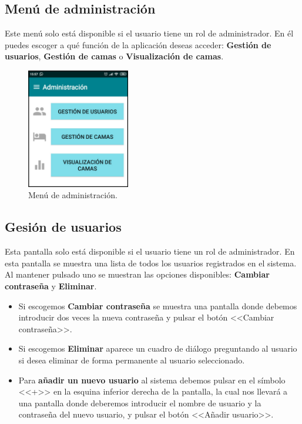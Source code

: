 \subsection{Menú de administración}

Este menú solo está disponible si el usuario tiene un rol de administrador. En él puedes escoger a qué función de la aplicación deseas acceder: \textbf{Gestión de usuarios}, \textbf{Gestión de camas} o \textbf{Visualización de camas}. 

\begin{figure}[H]
	\centering
	\includegraphics[width=0.4\textwidth]{../img/menudeadministracion.png}
	\caption{Menú de administración.}
	\label{fig:menudeadministracion}
\end{figure}

\subsection{Gesión de usuarios}

Esta pantalla solo está disponible si el usuario tiene un rol de administrador. En esta pantalla se muestra una lista de todos los usuarios registrados en el sistema. Al mantener pulsado uno se muestran las opciones disponibles: \textbf{Cambiar contraseña} y \textbf{Eliminar}.

\begin{itemize}
	\item Si escogemos \textbf{Cambiar contraseña} se muestra una pantalla donde debemos introducir dos veces la nueva contraseña y pulsar el botón <<Cambiar contraseña>>.
	\item Si escogemos \textbf{Eliminar} aparece un cuadro de diálogo preguntando al usuario si desea eliminar de forma permanente al usuario seleccionado. 
	\item Para \textbf{añadir un nuevo usuario} al sistema debemos pulsar en el símbolo <<+>> en la esquina inferior derecha de la pantalla, la cual nos llevará a una pantalla donde deberemos introducir el nombre de usuario y la contraseña del nuevo usuario, y pulsar el botón <<Añadir usuario>>. 
\end{itemize}  


